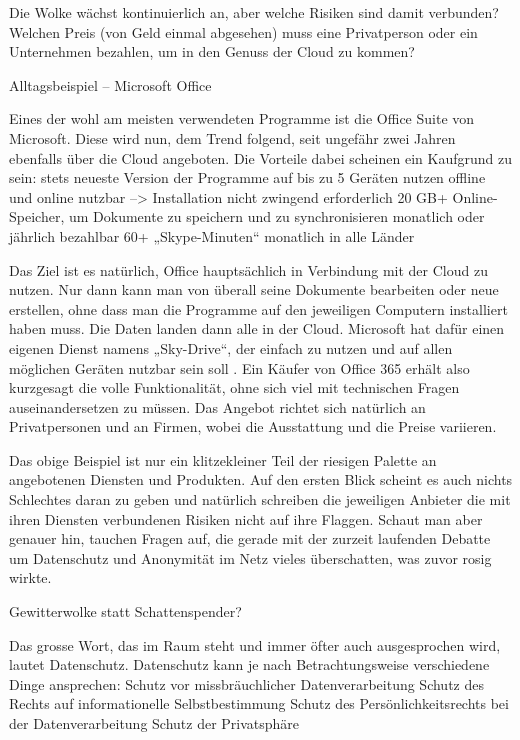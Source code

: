   Die Wolke wächst kontinuierlich an, aber welche Risiken sind damit verbunden? Welchen Preis (von Geld einmal abgesehen) muss eine Privatperson oder ein Unternehmen bezahlen, um in den Genuss der Cloud zu kommen?

  Alltagsbeispiel – Microsoft Office

  Eines der wohl am meisten verwendeten Programme ist die Office Suite von Microsoft. Diese wird nun, dem Trend folgend, seit ungefähr zwei Jahren ebenfalls über die Cloud angeboten. Die Vorteile dabei scheinen ein Kaufgrund zu sein:
  stets neueste Version der Programme
  auf bis zu 5 Geräten nutzen
  offline und online nutzbar --> Installation nicht zwingend erforderlich
  20 GB+ Online-Speicher, um Dokumente zu speichern und zu synchronisieren
  monatlich oder jährlich bezahlbar
  60+ „Skype-Minuten“ monatlich in alle Länder


  Das Ziel ist es natürlich, Office hauptsächlich in Verbindung mit der Cloud zu nutzen. Nur dann kann man von überall seine Dokumente bearbeiten oder neue erstellen, ohne dass man die Programme auf den jeweiligen Computern installiert haben muss. Die Daten landen dann alle in der Cloud. Microsoft hat dafür einen eigenen Dienst namens „Sky-Drive“, der einfach zu nutzen und auf allen möglichen Geräten nutzbar sein soll . Ein Käufer von Office 365 erhält also kurzgesagt die volle Funktionalität, ohne sich viel mit technischen Fragen auseinandersetzen zu müssen.
  Das Angebot richtet sich natürlich an Privatpersonen und an Firmen, wobei die Ausstattung und die Preise variieren.

  Das obige Beispiel ist nur ein klitzekleiner Teil der riesigen Palette an angebotenen Diensten und Produkten. Auf den ersten Blick scheint es auch nichts Schlechtes daran zu geben und natürlich schreiben die jeweiligen Anbieter die mit ihren Diensten verbundenen Risiken nicht auf ihre Flaggen. Schaut man aber genauer hin, tauchen Fragen auf, die gerade mit der zurzeit laufenden Debatte um Datenschutz und Anonymität im Netz vieles überschatten, was zuvor rosig wirkte.

  Gewitterwolke statt Schattenspender?

  Das grosse Wort, das im Raum steht und immer öfter auch ausgesprochen wird, lautet Datenschutz. Datenschutz kann je nach Betrachtungsweise verschiedene Dinge ansprechen:
  Schutz vor missbräuchlicher Datenverarbeitung
  Schutz des Rechts auf informationelle Selbstbestimmung
  Schutz des Persönlichkeitsrechts bei der Datenverarbeitung
  Schutz der Privatsphäre


